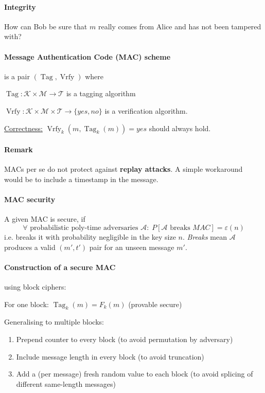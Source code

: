 \paragraph{Integrity}
How can Bob be sure that $m$ really comes from Alice and has not been tampered with?

\paragraph{Message Authentication Code (MAC) scheme} is a pair $(\operatorname{Tag}, \operatorname{Vrfy})$ where 

$\operatorname{Tag}:  \mathcal{K} \times \mathcal{M} \rightarrow \mathcal{T}$ is a tagging algorithm

$\operatorname{Vrfy}:  \mathcal{K} \times \mathcal{M} \times \mathcal{T} \rightarrow \{\textit{yes}, \textit{no}\}$ is a verification algorithm.

\underline{Correctness:} $\operatorname{Vrfy}_k(m,\operatorname{Tag}_k(m)) = \textit{yes}$ should always hold.

\paragraph{Remark} MACs per se do not protect against \textbf{replay attacks}. A simple workaround would be to include a timestamp in the message.

\paragraph{MAC security} A given MAC is secure, if 
$$\forall \text{ probabilistic poly-time adversaries } \mathcal{A}: \; P [ \mathcal{A} \text{ breaks } MAC ] = \varepsilon(n) $$
i.e. breaks it with probability negligible in the key size $n$. \textit{Breaks} mean $\mathcal{A}$ produces a valid $(m', t')$ pair for an unseen message $m'$.

\paragraph{Construction of a secure MAC} using block ciphers:

For one block: $\operatorname{Tag}_k(m) = F_k(m)$ (provable secure)

Generalising to multiple blocks: 

\begin{enumerate}
    \item Prepend counter to every block (to avoid permutation by adversary)
    \item Include message length in every block (to avoid truncation)
    \item Add a (per message) fresh random value to each block (to avoid splicing of different same-length messages)
\end{enumerate}

